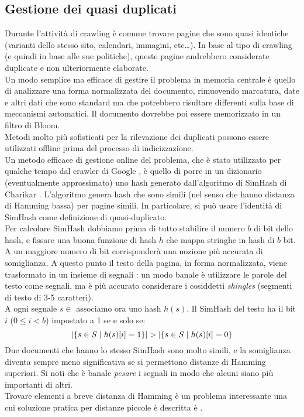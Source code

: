 \subsection{Gestione dei quasi duplicati}
Durante l'attività di crawling è comune trovare pagine che sono quasi identiche (varianti dello stesso sito, calendari, immagini, etc\dots). In base al tipo di crawling (e quindi in base alle sue politiche), queste pagine andrebbero considerate duplicate e non ulteriormente elaborate.\\
Un modo semplice ma efficace di gestire il problema in memoria centrale è quello di analizzare una forma normalizzata del documento, rimuovendo marcatura, date e altri dati che sono standard ma che potrebbero risultare differenti sulla base di meccanismi automatici. Il documento dovrebbe poi essere memorizzato in un filtro di Bloom.\\
Metodi molto più sofisticati per la rilevazione dei duplicati possono essere utilizzati offline prima del processo di indicizzazione.\\
Un metodo efficace di gestione online del problema, che è stato utilizzato per qualche tempo dal crawler di Google \cite{simhashgoogle}, è quello di porre in un dizionario (eventualmente approssimato) uno hash generato dall'algoritmo di SimHash di Charikar \cite{SimHash}. L'algoritmo genera hash che sono simili (nel senso che hanno distanza di Hamming bassa) per pagine simili. In particolare, si può usare l'identità di SimHash come definizione di quasi-duplicato.\\
Per calcolare SimHash dobbiamo prima di tutto stabilire il numero $b$ di bit dello hash, e fissare una buona funzione di hash $h$ che mappa stringhe in hash di $b$ bit. A un maggiore numero di bit corrisponderà una nozione più accurata di somiglianza. A questo punto il testo della pagina, in forma normalizzata, viene trasformato in un insieme di segnali : un modo banale è utilizzare le parole del testo come segnali, ma è più accurato considerare i cosiddetti \textit{shingles} (segmenti di testo di 3-5 caratteri).\\
A ogni segnale $s \in$  associamo ora uno hash $h(s)$. Il SimHash del testo ha il bit $i$ ($0 \leq i < b$) impostato a 1 se e solo se:
\begin{equation*}
    |\{s \in S \hspace{1mm}|\hspace{1mm} h(s)[i] = 1\}| > |\{s \in S \hspace{1mm}|\hspace{1mm} h(s)[i] = 0\}
\end{equation*}
Due documenti che hanno lo stesso SimHash sono molto simili, e la somiglianza diventa sempre meno significativa se si permettono distanze di Hamming superiori. Si noti che è banale \textit{pesare} i segnali in modo che alcuni siano più importanti di altri.\\
Trovare elementi a breve distanza di Hamming è un problema interessante una cui soluzione pratica per distanze piccole è descritta è \cite{google}.\\
